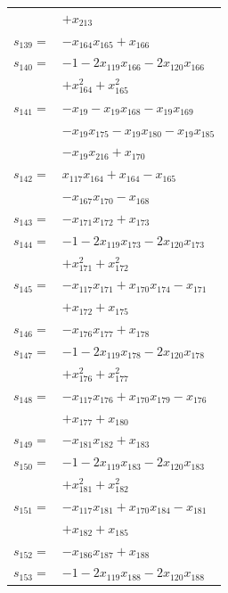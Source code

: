 \begin{longtable}{@{}r@{\;}l@{}}
 & \(\displaystyle +x_{213}\) \\[3pt]
\(s_{139}=\) & \(\displaystyle -x_{164}x_{165} +x_{166}\) \\[3pt]
\(s_{140}=\) & \(\displaystyle -1 -2x_{119}x_{166} -2x_{120}x_{166}\) \\
 & \(\displaystyle +x_{164}^{2} +x_{165}^{2}\) \\[3pt]
\(s_{141}=\) & \(\displaystyle -x_{19} -x_{19}x_{168} -x_{19}x_{169}\) \\
 & \(\displaystyle -x_{19}x_{175} -x_{19}x_{180} -x_{19}x_{185}\) \\
 & \(\displaystyle -x_{19}x_{216} +x_{170}\) \\[3pt]
\(s_{142}=\) & \(\displaystyle x_{117}x_{164} +x_{164} -x_{165}\) \\
 & \(\displaystyle -x_{167}x_{170} -x_{168}\) \\[3pt]
\(s_{143}=\) & \(\displaystyle -x_{171}x_{172} +x_{173}\) \\[3pt]
\(s_{144}=\) & \(\displaystyle -1 -2x_{119}x_{173} -2x_{120}x_{173}\) \\
 & \(\displaystyle +x_{171}^{2} +x_{172}^{2}\) \\[3pt]
\(s_{145}=\) & \(\displaystyle -x_{117}x_{171} +x_{170}x_{174} -x_{171}\) \\
 & \(\displaystyle +x_{172} +x_{175}\) \\[3pt]
\(s_{146}=\) & \(\displaystyle -x_{176}x_{177} +x_{178}\) \\[3pt]
\(s_{147}=\) & \(\displaystyle -1 -2x_{119}x_{178} -2x_{120}x_{178}\) \\
 & \(\displaystyle +x_{176}^{2} +x_{177}^{2}\) \\[3pt]
\(s_{148}=\) & \(\displaystyle -x_{117}x_{176} +x_{170}x_{179} -x_{176}\) \\
 & \(\displaystyle +x_{177} +x_{180}\) \\[3pt]
\(s_{149}=\) & \(\displaystyle -x_{181}x_{182} +x_{183}\) \\[3pt]
\(s_{150}=\) & \(\displaystyle -1 -2x_{119}x_{183} -2x_{120}x_{183}\) \\
 & \(\displaystyle +x_{181}^{2} +x_{182}^{2}\) \\[3pt]
\(s_{151}=\) & \(\displaystyle -x_{117}x_{181} +x_{170}x_{184} -x_{181}\) \\
 & \(\displaystyle +x_{182} +x_{185}\) \\[3pt]
\(s_{152}=\) & \(\displaystyle -x_{186}x_{187} +x_{188}\) \\[3pt]
\(s_{153}=\) & \(\displaystyle -1 -2x_{119}x_{188} -2x_{120}x_{188}\) \\

\end{longtable}
